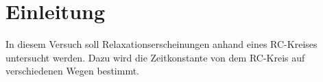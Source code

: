 \section{Einleitung}

In diesem Versuch soll Relaxationserscheinungen anhand eines RC-Kreises untersucht
werden.
Dazu wird die Zeitkonstante von dem RC-Kreis auf verschiedenen Wegen bestimmt.
